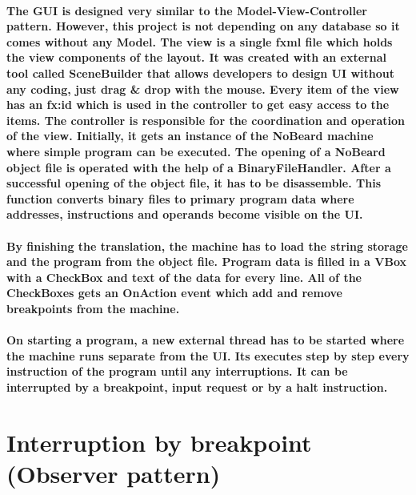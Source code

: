 \paragraph{The GUI is designed very similar to the Model-View-Controller pattern. However, this project is not depending on any database so it comes without any Model. The view is a single fxml file which holds the view components of the layout. It was created with an external tool called SceneBuilder that allows developers to design UI without any coding, just drag \& drop with the mouse. Every item of the view has an fx:id which is used in the controller to get easy access to the items. The controller is responsible for the coordination and operation of the view. Initially, it gets an instance of the NoBeard machine where simple program can be executed. The opening of a NoBeard object file is operated with the help of a BinaryFileHandler. After a successful opening of the object file, it has to be disassemble. This function converts binary files to primary program data where addresses, instructions and operands become visible on the UI.}
\paragraph{By finishing the translation, the machine has to load the string storage and the program from the object file. Program data is filled in a VBox with a CheckBox and text of the data for every line. All of the CheckBoxes gets an OnAction event which add and remove breakpoints from the machine.}
\paragraph{On starting a program, a new external thread has to be started where the machine runs separate from the UI. Its executes step by step every instruction of the program until any interruptions. It can be interrupted by a breakpoint, input request or by a halt instruction.}
\section{Interruption by breakpoint (Observer pattern)}
